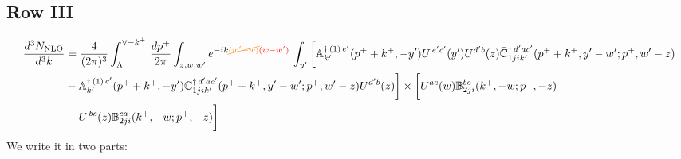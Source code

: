 \documentclass[9pt]{article}
\def\mf#1{\mathbb{#1}}
\numberwithin{equation}{section}
\begin{document}
 \subsection{Row III}
 \begin{align}
    \frac{d^{3}N_{\rm NLO}}{d^{3}k} & =   \frac{4}{(2\pi)^{3}} \int_{\Lambda}^{\vee -k^{+}}\, \frac{dp^{+}}{2\pi}\int_{z,w,w^{\prime}} e^{-ik{\color{orange}\cancel{(w^{\prime}-w)}}{\color{red}(w-w^{\prime})}}\,\int_{y^{\prime}}\bigg[\mf{A}^{\dagger\, (1)\,e^{\prime}}_{k^{\prime}}(p^{+}+k^{+},-y^{\prime})U^{\, e^{\prime}c^{\prime}}(y^{\prime})U^{d^{\prime}b}(z) \Bar{\mf{C}}^{\dagger\, d^{\prime}ac^{\prime}}_{1jik^{\prime}}(p^{+}+k^{+},y^{\prime}-w^{\prime}; p^{+},w^{\prime}-z)\notag \\ &  -\Bar{\mf{A}}^{\dagger\, (1)\,c^{\prime}}_{k^{\prime}}(p^{+}+k^{+},-y^{\prime}) \Bar{\mf{C}}^{\dagger\, d^{\prime}ac^{\prime}}_{1jik^{\prime}}(p^{+}+k^{+},y^{\prime}-w^{\prime}; p^{+},w^{\prime}-z)U^{d^{\prime}b}(z)\bigg] \times \bigg[U^{ac}(w) \mf{B}^{bc}_{2ji}(k^{+},-w;p^{+},-z)\notag \\ &  -U^{\, bc}(z)\Bar{\mf{B}}^{ca}_{2ji}(k^{+},-w; p^{+},-z)\bigg]\nonumber
\end{align}
We write it in two parts:
\end{document}
